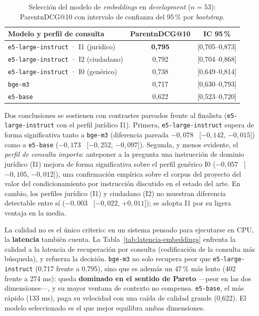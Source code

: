 \begin{table}[htbp]
    \centering
    \small
    \renewcommand{\arraystretch}{1.2}
    \caption{Selección del modelo de \emph{embeddings} en \emph{development} ($n=53$): ParentnDCG@10 con intervalo de confianza del 95\,\% por \emph{bootstrap}.}
    \label{tab:bakeoff}
    \begin{tabular}{|l|c|c|}
        \hline
        \textbf{Modelo y perfil de consulta} & \textbf{ParentnDCG@10} & \textbf{IC 95\,\%} \\
        \hline
        \texttt{e5-large-instruct} · I1 (jurídico)   & \textbf{0,795} & [0,705--0,873] \\
        \texttt{e5-large-instruct} · I2 (ciudadano)  & 0,792          & [0,704--0,868] \\
        \texttt{e5-large-instruct} · I0 (genérico)   & 0,738          & [0,649--0,814] \\
        \texttt{bge-m3}                              & 0,717          & [0,630--0,793] \\
        \texttt{e5-base}                             & 0,622          & [0,523--0,720] \\
        \hline
    \end{tabular}
\end{table}

Dos conclusiones se sostienen con contrastes pareados frente al finalista (\texttt{e5-large-instruct} con el perfil jurídico I1). Primera, \texttt{e5-large-instruct} supera de forma significativa tanto a \texttt{bge-m3} (diferencia pareada $-0{,}078$ \ [$-0{,}142$, $-0{,}015$]) como a \texttt{e5-base} ($-0{,}173$ \ [$-0{,}252$, $-0{,}097$]). Segunda, y menos evidente, el \emph{perfil de consulta importa}: anteponer a la pregunta una instrucción de dominio jurídico (I1) mejora de forma significativa sobre el perfil genérico I0 ($-0{,}057$ \ [$-0{,}105$, $-0{,}012$]), una confirmación empírica sobre el corpus del proyecto del valor del condicionamiento por instrucción discutido en el estado del arte. En cambio, los perfiles jurídico (I1) y ciudadano (I2) no muestran diferencia detectable entre sí ($-0{,}003$ \ [$-0{,}022$, $+0{,}011$]); se adopta I1 por su ligera ventaja en la media.

La calidad no es el único criterio: en un sistema pensado para ejecutarse en CPU, la \textbf{latencia} también cuenta. La Tabla~\ref{tab:latencia-embeddings} enfrenta la calidad a la latencia de recuperación por consulta (codificación de la consulta más búsqueda), y refuerza la decisión. \texttt{bge-m3} no solo recupera peor que \texttt{e5-large-instruct} (0,717 frente a 0,795), sino que es además un 47\,\% más lento (402 frente a 274 ms): queda \textbf{dominado en el sentido de Pareto} —peor en las dos dimensiones—, y su mayor ventana de contexto no compensa. \texttt{e5-base}, el más rápido (133 ms), paga su velocidad con una caída de calidad grande (0,622). El modelo seleccionado es el que mejor equilibra ambas dimensiones.

